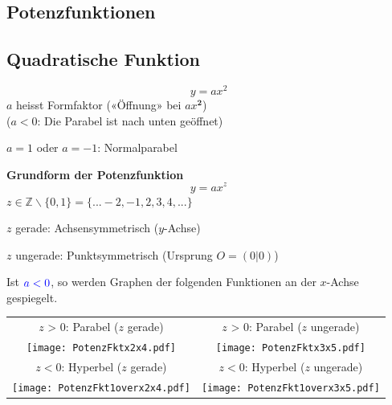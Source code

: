 \begin{multicols}{2}

\forceCB
\section*{Potenzfunktionen}

\subsection*{Quadratische Funktion}
$$y=ax^2$$
$a$ heisst Formfaktor («Öffnung» bei $ax^\mathbf{2}$)\\
($a<0$: Die Parabel ist nach unten geöffnet)

$a=1$ oder $a=-1$: Normalparabel
\vspace*{\fill}

\begin{tcolorbox}[colback=white]
  \textbf{Grundform der Potenzfunktion}
$$y=ax^z$$
$z\in\mathbb{Z}\backslash\{0,1\} = \{...-2, -1, 2, 3, 4, ...\}$
\end{tcolorbox}

$z$ gerade: Achsensymmetrisch ($y$-Achse)

$z$ ungerade: Punktsymmetrisch (Ursprung $O=(0|0)$)


Ist ${\color{blue}a<0}$, so werden Graphen der folgenden Funktionen an der $x$-Achse gespiegelt.

\end{multicols}

\begin{tabular}{cc}
$z$ > 0: Parabel ($z$ gerade) & $z$ > 0: Parabel ($z$ ungerade)\\   %
  \texttt{[image: PotenzFktx2x4.pdf]} &
  \texttt{[image: PotenzFktx3x5.pdf]}\\

$z<0$: Hyperbel  ($z$ gerade) & $z<0$: Hyperbel ($z$ ungerade)\\
  \texttt{[image: PotenzFkt1overx2x4.pdf]}&
  \texttt{[image: PotenzFkt1overx3x5.pdf]}
  \end{tabular}



